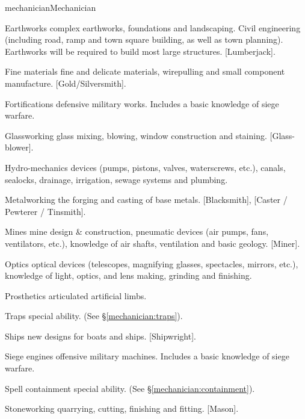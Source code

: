 \begin{Skill}[2.2]{mechanician}{Mechanician}
\begin{Description}
\item[Earthworks] complex earthworks, foundations and landscaping.
  Civil engineering (including road, ramp and town square building, as
  well as town planning).  Earthworks will be required to build most
  large structures. [Lumberjack].

\item[Fine] materials fine and delicate materials, wirepulling and
  small component manufacture.  [Gold/Silversmith].

\item[Fortifications] defensive military works. Includes a basic
  knowledge of siege warfare.

\item[Glassworking] glass mixing, blowing, window construction and
  staining. [Glass-blower].

\item[Hydro-mechanics] devices (pumps, pistons, valves, waterscrews,
  etc.), canals, sealocks, drainage, irrigation, sewage systems and
  plumbing.

\item[Metalworking] the forging and casting of base metals.
  [Blacksmith], [Caster / Pewterer / Tinsmith].

\item[Mines] mine design \& construction, pneumatic devices (air
  pumps, fans, ventilators, etc.), knowledge of air shafts,
  ventilation and basic geology.  [Miner].

\item[Optics] optical devices (telescopes, magnifying glasses,
  spectacles, mirrors, etc.), knowledge of light, optics, and lens
  making, grinding and finishing.

\item[Prosthetics] articulated artificial limbs. 

\item[Traps] special ability. (See \S\ref{mechanician:traps}).

\item[Ships] new designs for boats and ships.  [Shipwright].

\item[Siege] engines offensive military machines.  Includes a basic
  knowledge of siege warfare.

\item[Spell containment] special ability. (See
  \S\ref{mechanician:containment}).

\item[Stoneworking] quarrying, cutting, finishing and
  fitting. [Mason].


\end{Description}
\end{Skill}
